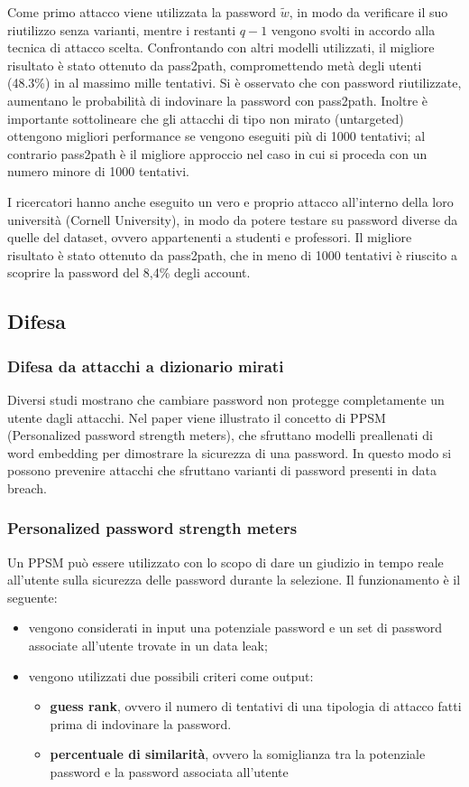 Come primo attacco viene utilizzata la password $\tilde{w}$, in modo da verificare il suo riutilizzo senza varianti, mentre i restanti $q - 1$ vengono svolti in accordo alla tecnica di attacco scelta. Confrontando con altri modelli utilizzati, il migliore risultato è stato ottenuto da pass2path, compromettendo metà degli utenti (48.3\%) in al massimo mille tentativi.
Si è osservato che con password riutilizzate, aumentano le probabilità di indovinare la password con pass2path.
Inoltre è importante sottolineare che gli attacchi di tipo non mirato (untargeted) ottengono migliori performance se vengono eseguiti più di 1000 tentativi; al contrario pass2path è il migliore approccio nel caso in cui si proceda con un numero minore di 1000 tentativi.


I ricercatori hanno anche eseguito un vero e proprio attacco all'interno della loro università (Cornell University), in modo da potere testare su password diverse da quelle del dataset, ovvero appartenenti a studenti e professori. Il migliore risultato è stato ottenuto da pass2path, che in meno di 1000 tentativi è riuscito a scoprire la password del 8,4\% degli account.


\subsection{Difesa}
\subsubsection{Difesa da attacchi a dizionario mirati}
Diversi studi mostrano che cambiare password non protegge completamente un utente dagli attacchi. 
Nel paper viene illustrato il concetto di PPSM (Personalized password strength meters), che sfruttano modelli preallenati di word embedding per dimostrare la sicurezza di una password.
In questo modo si possono prevenire attacchi che sfruttano varianti di password presenti in data breach. 

\subsubsection{Personalized password strength meters}
Un PPSM può essere utilizzato con lo scopo di dare un giudizio in tempo reale all'utente sulla sicurezza delle password durante la selezione.
Il funzionamento è il seguente:
\begin{itemize}
    \item vengono considerati in input una potenziale password e un set di password associate all'utente trovate in un data leak;
    \item vengono utilizzati due possibili criteri come output:
    \begin{itemize}
        \item \textbf{guess rank}, ovvero il numero di tentativi di una tipologia di attacco fatti prima di indovinare la password.
        \item \textbf{percentuale di similarità}, ovvero la somiglianza tra la potenziale password e la password associata all'utente
    \end{itemize}
\end{itemize}

